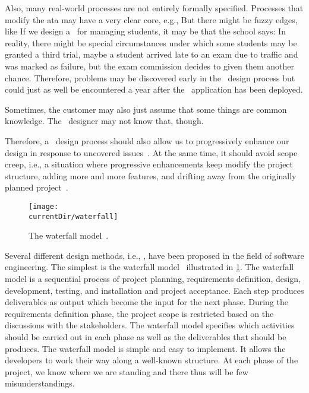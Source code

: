Also, many real-world processes are not entirely formally specified.
Processes that modify the ata may have a very clear core, e.g., 
But there might be fuzzy edges, like 
If we design a \db\ for managing students, it may be that the school says:
In reality, there might be special circumstances under which some students may be granted a third trial, maybe a student arrived late to an exam due to traffic and was marked as failure, but the exam commission decides to given them another chance.
Therefore, problems may be discovered early in the \db\ design process but could just as well be encountered a year after the \db\ application has been deployed.

Sometimes, the customer may also just assume that some things are common knowledge.
The \db\ designer may not know that, though.

Therefore, a \db\ design process should also allow us to progressively enhance our design in response to uncovered issues~\cite{GMTM2011DDLC,WK1989DKBSRTSDLC}.
At the same time, it should avoid scope creep, i.e., a situation where progressive enhancements keep modify the project structure, adding more and more features, and drifting away from the originally planned project~\cite{GMTM2011DDLC,WK1989DKBSRTSDLC}.%
%
%
%
\FloatBarrier%
%
\begin{figure}%
\centering%
\texttt{[image: \\currentDir/waterfall]}%
\caption{The waterfall model~\cite{PM2020SEAPA,GMTM2011DDLC,I2018SAH,N2024SEFDS}.}%
\label{fig:model:waterfall}%
\end{figure}%
%
Several different design methods, i.e., , have been proposed in the field of software engineering.
The simplest is the waterfall model~\cite{PM2020SEAPA,GMTM2011DDLC} illustrated in \cref{fig:model:waterfall}.
The waterfall model is a sequential process of project planning, requirements definition, design, development, testing, and installation and project acceptance.
Each step produces deliverables as output which become the input for the next phase.
During the requirements definition phase, the project scope is restricted based on the discussions with the stakeholders.
The waterfall model specifies which activities should be carried out in each phase as well as the deliverables that should be produces.
The waterfall model is simple and easy to implement.
It allows the developers to work their way along a well-known structure.
At each phase of the project, we know where we are standing and there thus will be few misunderstandings.

